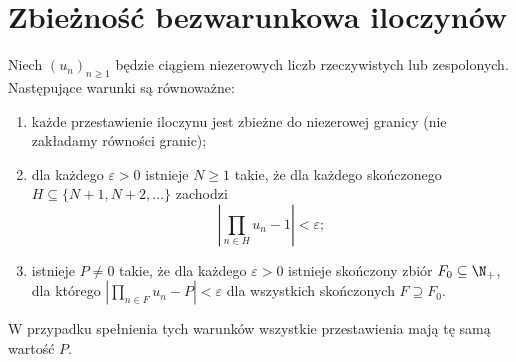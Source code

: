 \section{Zbieżność bezwarunkowa iloczynów}
\begin{twierdzenie}
\label{ma2:thm:product-finite-tails}
Niech $(u_n)_{n\ge1}$ będzie ciągiem niezerowych
liczb rzeczywistych lub zespolonych.
Następujące warunki są równoważne:
\begin{enumerate}[label=(\roman*)]
\item każde przestawienie iloczynu jest zbieżne do
niezerowej granicy (nie zakładamy równości granic);
\item dla każdego $\varepsilon>0$ istnieje $N\ge1$ takie,
że dla każdego skończonego $H\subseteq\{N+1,N+2,\ldots\}$
zachodzi
\[
 \left|\prod_{n\in H}u_n-1\right|<\varepsilon;
\]
\item istnieje $P\ne0$ takie, że dla każdego $\varepsilon>0$
istnieje skończony zbiór $F_0\subseteq\N_+$, dla którego
$|\prod_{n\in F}u_n-P|<\varepsilon$ dla wszystkich
skończonych $F\supseteq F_0$.
\end{enumerate}
W przypadku spełnienia tych warunków wszystkie
przestawienia mają tę samą wartość $P$.
\end{twierdzenie}
